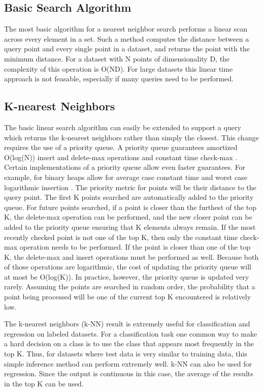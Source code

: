 \subsection{Basic Search Algorithm}

The most basic algorithm for a nearest neighbor search performs a linear scan across every element in a set.  Such a method computes the distance between a query point and every single point in a dataset, and returns the point with the minimum distance.  For a dataset with N points of dimensionality D, the complexity of this operation is O(ND).  For large datasets this linear time approach is not feasable, especially if many queries need to be performed.

\subsection{K-nearest Neighbors}
\label{subsec:knn}

The basic linear search algorithm can easily be extended to support a query which returns the k-nearest neighbors rather than simply the closest.  This change requires the use of a priority queue.  A priority queue guarantees amortized O(log(N)) insert and delete-max operations and constant time check-max \citep{van1976design}.  Certain implementations of a priority queue allow even faster guarantees.  For example, for binary heaps allow for average case constant time and worst case logarithmic insertion \citep{carlsson1988implicit}.  The priority metric for points will be their distance to the query point.  The first K points searched are automatically added to the priority queue.  For future points searched, if a point is closer than the furthest of the top K, the delete-max operation can be performed, and the new closer point can be added to the priority queue ensuring that K elements always remain.  If the most recently checked point is not one of the top K, then only the constant time check-max operation needs to be performed.  If the point is closer than one of the top K, the delete-max and insert operations must be performed as well.  Because both of those operations are logarithmic, the cost of updating the priority queue will at most be O(log(K)).  In practice, however, the priority queue is updated very rarely.  Assuming the points are searched in random order, the probability that a point being processed will be one of the current top K encountered is relatively low.

The k-nearest neighbors (k-NN) result is extremely useful for classification and regression on labeled datasets.  For a classification task one common way to make a hard decision on a class is to use the class that appears most frequently in the top K.  Thus, for datasets where test data is very similar to training data, this simple inference method can perform extremely well.  k-NN can also be used for regression.  Since the output is continuous in this case, the average of the results in the top K can be used.

